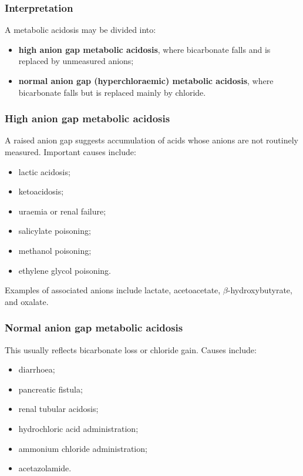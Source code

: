 \documentclass[11pt,a4paper]{article}
\begin{document}
\subsubsection{Interpretation}

A metabolic acidosis may be divided into:
\begin{itemize}
    \item \textbf{high anion gap metabolic acidosis}, where bicarbonate falls and is replaced by unmeasured anions;
    \item \textbf{normal anion gap (hyperchloraemic) metabolic acidosis}, where bicarbonate falls but is replaced mainly by chloride.
\end{itemize}

\subsubsection{High anion gap metabolic acidosis}

A raised anion gap suggests accumulation of acids whose anions are not routinely measured. Important causes include:
\begin{itemize}
    \item lactic acidosis;
    \item ketoacidosis;
    \item uraemia or renal failure;
    \item salicylate poisoning;
    \item methanol poisoning;
    \item ethylene glycol poisoning.
\end{itemize}

Examples of associated anions include lactate, acetoacetate, \(\beta\)-hydroxybutyrate, and oxalate.

\subsubsection{Normal anion gap metabolic acidosis}

This usually reflects bicarbonate loss or chloride gain. Causes include:
\begin{itemize}
    \item diarrhoea;
    \item pancreatic fistula;
    \item renal tubular acidosis;
    \item hydrochloric acid administration;
    \item ammonium chloride administration;
    \item acetazolamide.
\end{itemize}
\end{document}

